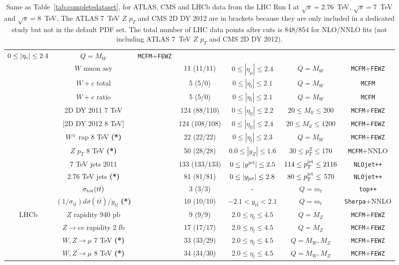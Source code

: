 \begin{table}[ht]
\begin{centering}
\begin{tabular}{|c|c|c|c|c|c|c|}
$0 \le |\eta_{\rm e}| \le 2.4  $ & $Q=M_W$  & {\tt MCFM}+{\tt FEWZ} \tabularnewline
 &   $W$ muon asy  & \cite{Chatrchyan:2013mza}&   11 (11/11) & 
$0 \le |\eta_{\mu}| \le 2.4  $  & $Q=M_W$ & {\tt MCFM}+{\tt FEWZ} \tabularnewline
&    $W+c$ total  & \cite{Chatrchyan:2013uja}& 5 (5/0) &  $0 \le |\eta_l| \le 2.1$ &
$Q=M_W$  & {\tt MCFM}
\tabularnewline
&    $W+c$ ratio  & \cite{Chatrchyan:2013uja}&  5 (5/0) & $0 \le |\eta_l| \le 2.1$ &
$Q=M_W$
& {\tt MCFM}
\tabularnewline
&   2D DY 2011 7 TeV    & \cite{Chatrchyan:2013tia} &   124 (88/110) & $0 \le |\eta_{ll}| \le 2.2$  &
$20 \le M_{ll} \le 200$  &  {\tt MCFM}+{\tt FEWZ}
\tabularnewline
&   [2D DY 2012 8 TeV]     & \cite{CMS:2014jea} &   124 (108/108) & $0 \le |\eta_{ll}| \le 2.4$  &
$20 \le M_{ll} \le 1200$  &  {\tt MCFM}+{\tt FEWZ}
\tabularnewline
&   $W^{\pm}$ rap 8 TeV  {\bf (*)}     & \cite{Khachatryan:2016pev} &  22 (22/22)   & $0 \le |\eta_{l}| \le 2.3$  &
$Q=M_W$  &  {\tt MCFM}+{\tt FEWZ}
\tabularnewline
&   $Z$ $p_T$ 8 TeV  {\bf (*)}     & \cite{Khachatryan:2015oaa} & 50 (28/28)    & $ 0.0 \le |y_{Z}| \le 1.6 $  &
$  30 \le p_T^Z \le 170 $   &  {\tt MCFM}+NNLO
\tabularnewline
 &   7 TeV jets 2011     & \cite{Chatrchyan:2012bja}&  133 (133/133) &  
$0 \le |y^{\rm jet}| \le 2.5$ & $114 \le p_T^{\rm jet} \le 2116$   &
{\tt NLOjet++}
\tabularnewline
 &   2.76 TeV jets  {\bf (*)}     & \cite{Khachatryan:2015luy}& 81 (81/81)   &  $0 \le |y_{\rm jet}| \le 2.8$
  & $80 \le p_T^{\rm jet} \le$ 570   & {\tt NLOjet++}
 \tabularnewline
&    $\sigma_{\rm tot}(t\bar{t})$   & \cite{Khachatryan:2016mqs,CMS:2016syx}& 
 3 (3/3) & - & $Q=m_t$ & {\tt top++} \tabularnewline
 &     $(1/\sigma_{t\bar{t}})d\sigma(t\bar{t})/y_{t\bar{t}}$ {\bf (*)}   & \cite{Khachatryan:2015oqa}& 
 10 (10/10)  & $-2.1<y_{t\bar{t}}<2.1$  & $Q=m_t$ & {\tt Sherpa}+NNLO \tabularnewline
 \hline
 \hline
\multirow{4}{*}{LHCb} &    $Z$ rapidity 940 pb  & \cite{Aaij:2012vn} &   9 (9/9) &
$2.0 \le \eta_l \le 4.5$& $Q=M_Z$ &
{\tt MCFM}+{\tt FEWZ} \tabularnewline
&    $Z\to ee$ rapidity 2 fb & \cite{Aaij:2012mda}&  17 (17/17) & $2.0 \le \eta_l \le 4.5$ & $Q=M_Z$  & {\tt MCFM}+{\tt FEWZ}
\tabularnewline
&    $W,Z\to \mu$ 7 TeV {\bf (*)}  & \cite{Aaij:2015gna} & 33 (33/29)  & $2.0 \le \eta_l \le 4.5$
& $Q=M_W,M_Z$ &  {\tt MCFM}+{\tt FEWZ}\tabularnewline
&    $W,Z\to \mu$ 8 TeV {\bf (*)}  & \cite{Aaij:2015zlq}  & 34 (34/30) & $2.0 \le \eta_l \le 4.5$
& $Q=M_W,M_Z$ &  {\tt MCFM}+{\tt FEWZ}  \tabularnewline
 \hline
 \end{tabular}
\par\end{centering}
\caption{\small
Same as Table~\ref{tab:completedataset}, for
ATLAS, CMS and LHCb data from the LHC Run I at
$\sqrt{s}=2.76$~TeV,  $\sqrt{s}=7$~TeV and
$\sqrt{s}=8$~TeV. The ATLAS $7$~TeV $Z$ $p_T$ and CMS 2D DY 2012 are
in  brackets because they are only included in a dedicated study
but not in the default PDF set.
The total number of LHC data points after cuts is $848/854$ 
for NLO/NNLO fits (not including ATLAS $7$~TeV $Z$ $p_T$ and CMS 2D DY 2012).
\label{tab:completedataset3}
}
\end{table}

